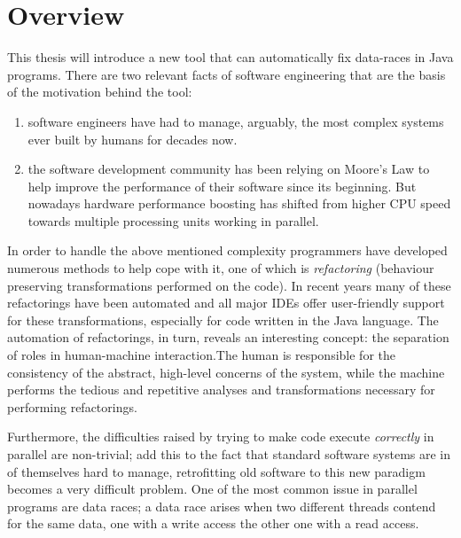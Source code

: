 \graphicspath{{content/summary/figures/}}

\section{Overview}



This thesis will introduce a new tool that can automatically fix data-races in
Java programs. There are two relevant facts of software engineering that are the
basis of the motivation behind the tool:
\begin{enumerate}
  \item software engineers have had to manage, arguably, the most complex
  systems ever built by humans for decades now.
  
  \item the software development community has been relying on Moore's Law
  to help improve the performance of their software since its beginning. But
  nowadays hardware performance boosting has shifted from higher CPU speed
  towards multiple processing units working in parallel.
\end{enumerate}

In order to handle the above mentioned complexity programmers have developed
numerous methods to help cope with it, one of which is \emph{refactoring}
(behaviour preserving transformations performed on the code). In recent years
many of these refactorings have been automated and all major IDEs offer
user-friendly support for these transformations, especially for code written in
the Java language. The automation of refactorings, in turn, reveals an
interesting concept: the separation of roles in human-machine interaction.The
human is responsible for the consistency of the abstract, high-level concerns of
the system, while the machine performs the tedious and repetitive analyses and
transformations necessary for performing refactorings.

Furthermore, the difficulties raised by trying to make code execute
\emph{correctly} in parallel are non-trivial; add this to the fact that standard
software systems are in of themselves hard to manage, retrofitting old software
to this new paradigm becomes a very difficult problem. One of the most common
issue in parallel programs are data races; a data race arises when two different
threads contend for the same data, one with a write access the other one with a
read access.


